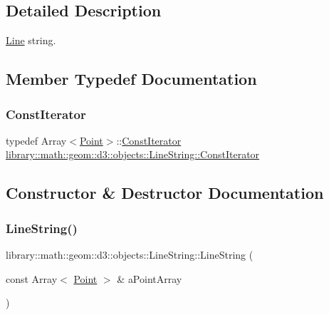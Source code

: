 \subsection{Detailed Description}
\hyperlink{classlibrary_1_1math_1_1geom_1_1d3_1_1objects_1_1_line}{Line} string. 

\subsection{Member Typedef Documentation}
\mbox{\label{classlibrary_1_1math_1_1geom_1_1d3_1_1objects_1_1_line_string_a87db0104282f9fcccdc5b1b99e2301e5}} 
\subsubsection{\texorpdfstring{Const\+Iterator}{ConstIterator}}
{\footnotesize\ttfamily typedef Array$<$\hyperlink{classlibrary_1_1math_1_1geom_1_1d3_1_1objects_1_1_point}{Point}$>$\+::\hyperlink{classlibrary_1_1math_1_1geom_1_1d3_1_1objects_1_1_line_string_a87db0104282f9fcccdc5b1b99e2301e5}{Const\+Iterator} \hyperlink{classlibrary_1_1math_1_1geom_1_1d3_1_1objects_1_1_line_string_a87db0104282f9fcccdc5b1b99e2301e5}{library\+::math\+::geom\+::d3\+::objects\+::\+Line\+String\+::\+Const\+Iterator}}



\subsection{Constructor \& Destructor Documentation}
\mbox{\label{classlibrary_1_1math_1_1geom_1_1d3_1_1objects_1_1_line_string_aab80e60f34f06d4ab9f84f0e59aa389e}} 
\subsubsection{\texorpdfstring{Line\+String()}{LineString()}}
{\footnotesize\ttfamily library\+::math\+::geom\+::d3\+::objects\+::\+Line\+String\+::\+Line\+String (\begin{DoxyParamCaption}\item[{const Array$<$ \hyperlink{classlibrary_1_1math_1_1geom_1_1d3_1_1objects_1_1_point}{Point} $>$ \&}]{a\+Point\+Array }\end{DoxyParamCaption})}



